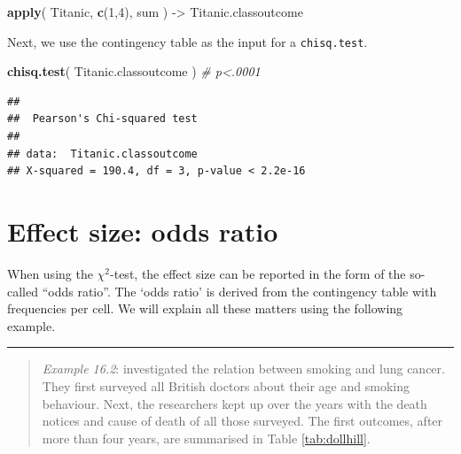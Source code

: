 \documentclass[
]{book}
\newenvironment{Shaded}{\begin{snugshade}}{\end{snugshade}}
\newcommand{\CommentTok}[1]{\textcolor[rgb]{0.56,0.35,0.01}{\textit{#1}}}
\newcommand{\DecValTok}[1]{\textcolor[rgb]{0.00,0.00,0.81}{#1}}
\newcommand{\KeywordTok}[1]{\textcolor[rgb]{0.13,0.29,0.53}{\textbf{#1}}}
\newcommand{\NormalTok}[1]{#1}
\newcommand{\StringTok}[1]{\textcolor[rgb]{0.31,0.60,0.02}{#1}}
\begin{document}
\begin{Shaded}
\begin{Highlighting}[]
\KeywordTok{apply}\NormalTok{( Titanic, }\KeywordTok{c}\NormalTok{(}\DecValTok{1}\NormalTok{,}\DecValTok{4}\NormalTok{), sum ) {-}\textgreater{}}\StringTok{ }\NormalTok{Titanic.classoutcome}
\end{Highlighting}
\end{Shaded}

Next, we use the contingency table as the input for a \texttt{chisq.test}.

\begin{Shaded}
\begin{Highlighting}[]
\KeywordTok{chisq.test}\NormalTok{( Titanic.classoutcome )  }\CommentTok{\# p\textless{}.0001}
\end{Highlighting}
\end{Shaded}

\begin{verbatim}
## 
##  Pearson's Chi-squared test
## 
## data:  Titanic.classoutcome
## X-squared = 190.4, df = 3, p-value < 2.2e-16
\end{verbatim}

\hypertarget{effect-size-odds-ratio}{%
\section{Effect size: odds ratio}\label{effect-size-odds-ratio}}

When using the \(\chi^2\)-test, the effect size can be reported in the form
of the so-called ``odds ratio''. The `odds ratio' is derived from the contingency
table with frequencies per cell. We will explain all these matters
using the following example.

\begin{center}\rule{0.5\linewidth}{0.5pt}\end{center}

\begin{quote}
\emph{Example 16.2}:
\citet{DollHill1956} investigated the relation between smoking
and lung cancer. They first surveyed all British doctors about
their age and smoking behaviour. Next, the researchers kept up over the years with
the death notices and cause of death of all those surveyed. The first
outcomes, after more than four years, are summarised in
Table \ref{tab:dollhill}.
\end{quote}
\end{document}
